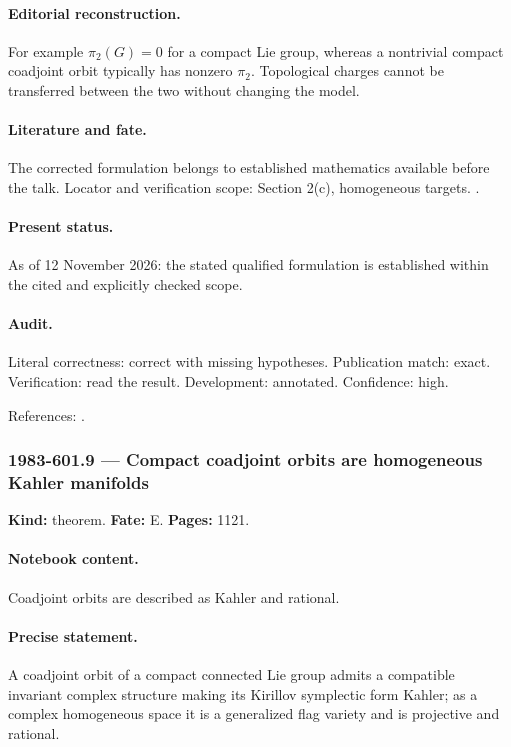 \paragraph{Editorial reconstruction.} For example \(\pi_2(G)=0\) for a compact Lie group, whereas a nontrivial compact coadjoint orbit typically has nonzero \(\pi_2\). Topological charges cannot be transferred between the two without changing the model.

\paragraph{Literature and fate.} The corrected formulation belongs to established mathematics available before the talk. Locator and verification scope: Section 2(c), homogeneous targets. \cite{perelomov1981instantons}.

\paragraph{Present status.} As of 12 November 2026: the stated qualified formulation is established within the cited and explicitly checked scope.

\paragraph{Audit.} Literal correctness: correct with missing hypotheses. Publication match: exact. Verification: read the result. Development: annotated. Confidence: high.

\noindent References: \citep{perelomov1981instantons}.\par

\subsubsection{1983-601.9 --- Compact coadjoint orbits are homogeneous Kahler manifolds}

\label{item:1983-601.9}

\noindent\textbf{Kind:} theorem. \textbf{Fate:} E. \textbf{Pages:} 1121.\par

\paragraph{Notebook content.} Coadjoint orbits are described as Kahler and rational.

\paragraph{Precise statement.} A coadjoint orbit of a compact connected Lie group admits a compatible invariant complex structure making its Kirillov symplectic form Kahler; as a complex homogeneous space it is a generalized flag variety and is projective and rational.

